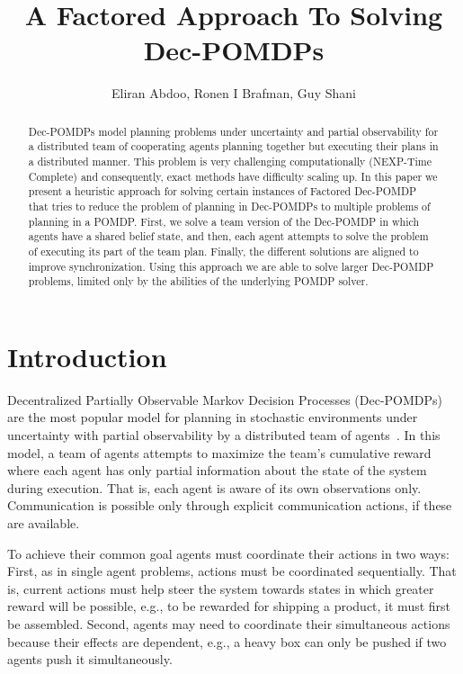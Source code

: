 \documentclass[letterpaper]{article} %
\title{A Factored Approach To Solving Dec-POMDPs }
\author{Eliran Abdoo, Ronen I Brafman, Guy Shani}
\begin{document}
\maketitle

\begin{abstract}
Dec-POMDPs model planning problems under uncertainty and partial observability for a distributed team of cooperating agents planning together but executing their plans in a distributed manner. This problem is
very challenging computationally (NEXP-Time Complete) and consequently, exact methods have difficulty scaling up. In this paper
we present a heuristic approach for solving certain instances of Factored Dec-POMDP that tries to reduce the problem of planning in Dec-POMDPs to multiple
problems of planning in a POMDP. First, we solve a team version of the Dec-POMDP in which agents have a shared belief state, and then, each agent attempts to solve the problem of executing its part of the team plan. Finally, the different solutions are aligned to improve synchronization. Using this approach we are able to solve larger Dec-POMDP problems, limited only by the abilities of the underlying POMDP solver.
\end{abstract}




\section{Introduction}
Decentralized Partially Observable Markov Decision Processes (Dec-POMDPs) are the most popular model for planning in stochastic environments under uncertainty with partial observability by a distributed team of agents~\cite{}. In this model, a team of agents attempts to maximize the team's cumulative reward where each agent has only partial information about the state of the system during execution. That is, each agent is aware of its own observations only. Communication is possible only through explicit communication actions, if these are available.  

To achieve their common goal agents must coordinate their actions in two ways: First, as in single agent problems, actions must be coordinated sequentially. That is, current actions must help steer the system towards states in which greater reward will be possible,
e.g., to be rewarded for shipping a product, it must first be assembled. 
Second, agents may need to coordinate their simultaneous actions because their effects are dependent, e.g., a heavy box can only be pushed if two agents push it simultaneously. 
\end{document}
